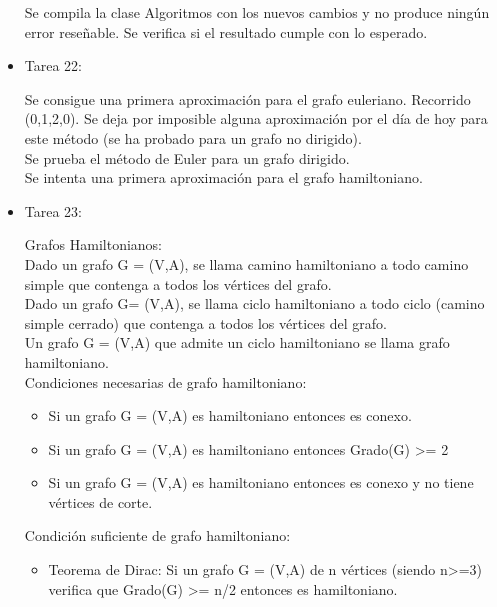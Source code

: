 \begin{itemize}
Se compila la clase Algoritmos con los nuevos cambios y no produce ningún error reseñable. Se verifica si el resultado cumple con lo esperado.\\

\item Tarea 22:

Se consigue una primera aproximación para el grafo euleriano. Recorrido (0,1,2,0). Se deja por imposible alguna aproximación por el día de hoy para este método (se ha probado para un grafo no dirigido).\\

Se prueba el método de Euler para un grafo dirigido.\\

Se intenta una primera aproximación para el grafo hamiltoniano.\\

\item Tarea 23:
 
Grafos Hamiltonianos:\\

Dado un grafo G = (V,A), se llama camino hamiltoniano a todo camino simple que contenga a todos los vértices del grafo.\\

Dado un grafo G= (V,A), se llama ciclo hamiltoniano a todo ciclo (camino simple cerrado) que contenga a todos los vértices del grafo.\\

Un grafo G = (V,A) que admite un ciclo hamiltoniano se llama grafo hamiltoniano.\\

Condiciones necesarias de grafo hamiltoniano:
\begin{itemize}
\item Si un grafo G = (V,A) es hamiltoniano entonces es conexo.
\item Si un grafo G = (V,A) es hamiltoniano entonces Grado(G) >= 2
\item Si un grafo G = (V,A) es hamiltoniano entonces es conexo y no tiene vértices de corte.
\end{itemize}

Condición suficiente de grafo hamiltoniano:
\begin{itemize}
\item Teorema de Dirac: Si un grafo G = (V,A) de n vértices (siendo n>=3) verifica que Grado(G) >= n/2 entonces es hamiltoniano.
\end{itemize}


\end{itemize}
